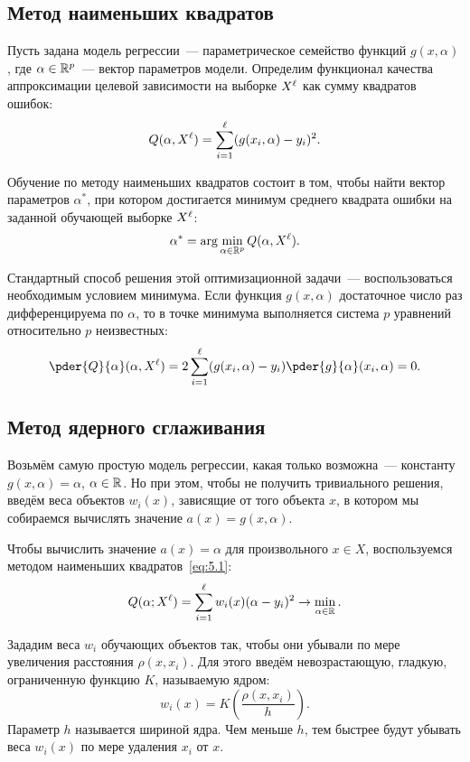 \subsection{Метод наименьших квадратов}
Пусть задана модель регрессии~--- параметрическое семейство функций \( g(x, \alpha) \), где
\( \alpha\in\mathbb{R}^p \)~--- вектор параметров модели. Определим функционал качества аппроксимации целевой
зависимости на выборке \( X^\ell \) как сумму квадратов ошибок:
\begin{equation}
  Q(\alpha, X^\ell) = \sum_{i = 1}^\ell (g(x_i, \alpha) - y_i)^2.
  \label{eq:5.1}
\end{equation}

Обучение по методу наименьших квадратов состоит в том, чтобы найти вектор параметров \( \alpha^* \),
при котором достигается минимум среднего квадрата ошибки на заданной обучающей выборке \( X^\ell \):
\begin{equation}
  \alpha^* = \arg\min_{\alpha\in\mathbb{R}^p} Q(\alpha, X^\ell).
  \label{eq:5.2}
\end{equation}

Стандартный способ решения этой оптимизационной задачи~--- воспользоваться необходимым условием
минимума. Если функция \( g(x, \alpha) \) достаточное число раз дифференцируема по \( \alpha \), то в
точке минимума выполняется система \( p \) уравнений относительно \( p \) неизвестных:
\begin{equation}
  \pder{Q}{\alpha}(\alpha, X^\l) = 2\sum_{i = 1}^\l(g(x_i, \alpha) - y_i)\pder{g}{\alpha}(x_i, \alpha) = 0.
  \label{eq:5.3}
\end{equation}

\subsection{Метод ядерного сглаживания}
Возьмём самую простую модель регрессии, какая только возможна~--- константу \( g(x, \alpha) = \alpha \),
\( \alpha\in\mathbb{R} \). Но при этом, чтобы не получить тривиального решения, введём веса объектов \( w_i(x) \),
зависящие от того объекта \( x \), в котором мы собираемся вычислять значение \( a(x) = g(x, \alpha) \).

Чтобы вычислить значение \( a(x) = \alpha \) для произвольного \( x\in X \), воспользуемся методом
наименьших квадратов~\eqref{eq:5.1}:
\[
  Q(\alpha; X^\ell) = \sum_{i = 1}^\ell w_i(x)(\alpha - y_i)^2\to\min_{\alpha\in\mathbb{R}}.
\]

Зададим веса \( w_i \) обучающих объектов так, чтобы они убывали по мере увеличения расстояния
\( \rho(x, x_i) \). Для этого введём невозрастающую, гладкую, ограниченную функцию \( K \), называемую
ядром:
\[
  w_i(x) = K\left(\frac{\rho(x, x_i)}{h}\right).
\]
Параметр \( h \) называется шириной ядра. Чем меньше \( h \), тем быстрее будут убывать веса
\( w_i(x) \) по мере удаления \( x_i \) от \( x \).

